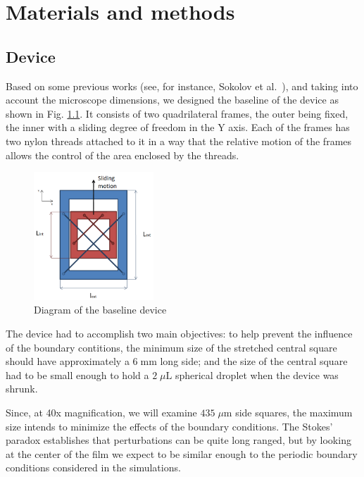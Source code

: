 \chapter{Materials and methods}
\label{materias_methods}

\section{Device}

Based on some previous works (see, for instance, Sokolov et al.~\cite{Sokolov2007}), and taking into account the microscope dimensions, we designed the baseline of the device as shown in Fig. \ref{device_baseline}. It consists of two quadrilateral frames, the outer being fixed, the inner with a sliding degree of freedom in the Y axis. Each of the frames has two nylon threads attached to it in a way that the relative motion of the frames allows the control of the area enclosed by the threads.

\begin{figure}[H]
	\centering
	\includegraphics[width=0.4\textwidth]{archivos/baseline_device.png}
	\caption{Diagram of the baseline device}
	\label{device_baseline}
\end{figure}

The device had to accomplish two main objectives: to help prevent the influence of the boundary contitions, the minimum size of the stretched central square should have approximately a $6 \; \textrm{mm}$ long side; and the size of the central square had to be small enough to hold a $2 \; \mu \textrm{L}$ spherical droplet when the device was shrunk. 

Since, at 40x magnification, we will examine $435 \; \mu \textrm{m}$ side squares, the maximum size intends to minimize the effects of the boundary conditions. The Stokes' paradox establishes that perturbations can be quite long ranged, but by looking at the center of the film we expect to be similar enough to the periodic boundary conditions considered in the simulations.

